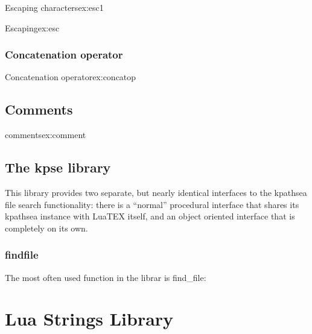 \begin{texexample}{Escaping characters}{ex:esc1}
\ttfamily {}
\end{texexample}


\begin{texexample}{Escaping}{ex:esc}
\ttfamily {}
\end{texexample}

\subsection{Concatenation operator}

\begin{texexample}{Concatenation operator}{ex:concatop}
\ttfamily {}
\end{texexample}

\section{Comments}
\begin{texexample}{comments}{ex:comment}
\ttfamily {}
\end{texexample}


\section{The kpse library}

This library provides two separate, but nearly identical interfaces to the kpathsea file search
functionality: there is a \enquote{normal} procedural interface that shares its kpathsea instance with
LuaTEX itself, and an object oriented interface that is completely on its own.

\subsection{find\textunderscore file}

The most often used function in the librar is \textsf{find\_file}:

\chapter{Lua Strings Library}

